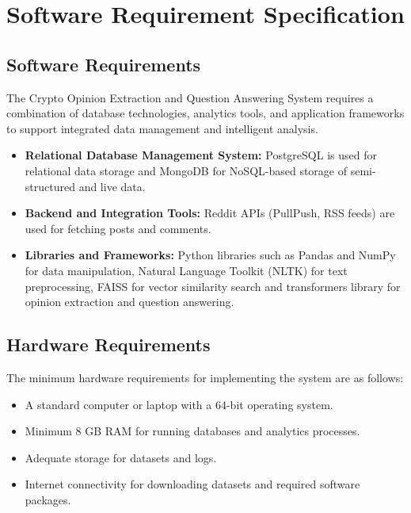 
\chapter{Software Requirement Specification}

\section{Software Requirements}

The Crypto Opinion Extraction and Question Answering System requires a combination of database technologies, analytics tools, and application frameworks to support integrated data management and intelligent analysis.

\begin{itemize}
    \item \textbf{Relational Database Management System:} PostgreSQL is used for relational data storage and MongoDB for NoSQL-based storage of semi-structured and live data.
    \item \textbf{Backend and Integration Tools:} Reddit APIs (PullPush, RSS feeds) are used for fetching posts and comments.
    \item \textbf{Libraries and Frameworks:} Python libraries such as Pandas and NumPy for data manipulation, Natural Language Toolkit (NLTK) for text preprocessing, FAISS for vector similarity search and transformers library for opinion extraction and question answering.
\end{itemize}

\section{Hardware Requirements}

The minimum hardware requirements for implementing the system are as follows:

\begin{itemize}
    \item A standard computer or laptop with a 64-bit operating system.
    \item Minimum 8 GB RAM for running databases and analytics processes.
    \item Adequate storage for datasets and logs.
    \item Internet connectivity for downloading datasets and required software packages.
\end{itemize}

